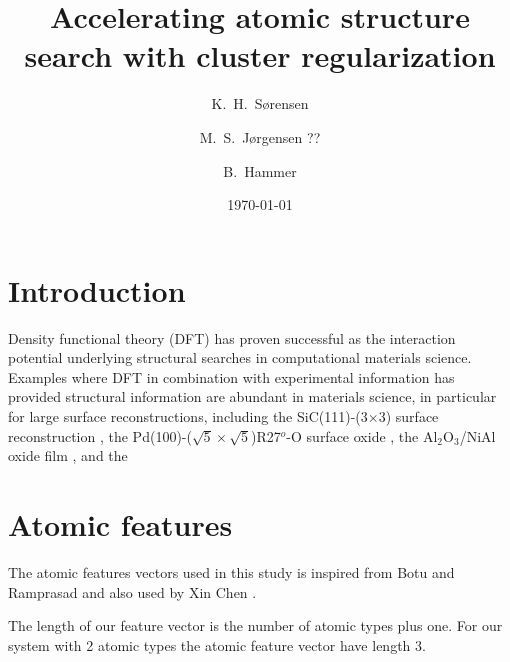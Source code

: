 \documentclass[%
 aps,
 prl,%
 amsmath,amssymb,
 reprint,%
]{revtex4-1}
\begin{document}
\title[]{Accelerating atomic structure search with cluster regularization}%

\author{K.\ H.\ S{\o}rensen}
\author{M.\ S.\ J{\o}rgensen ??}
\author{B.\ Hammer}
 
\date{\today}%

\begin{abstract}
\end{abstract}

\keywords{}%
\maketitle

\section{\label{sec:introduction}Introduction}
Density functional theory (DFT) has proven successful as the
interaction potential underlying structural searches in computational
materials science. Examples where DFT in combination with experimental information
has provided structural information are abundant in materials science, in particular
for large surface reconstructions, including the SiC(111)-(3$\times$3) surface reconstruction \cite{Starke1998}, the Pd(100)-($\sqrt{5}\times \sqrt{5}$)R27$^o$-O surface oxide \cite{Todorova2003}, the Al$_2$O$_3$/NiAl oxide film \cite{Kresse2005}, and the


\section{Atomic features}
 
The atomic features vectors used in this study is inspired from Botu and Ramprasad \cite{Boto2015} and also used by Xin Chen \cite{Chen2017}.

The length of our feature vector is the number of atomic types plus one. For our system with 2 atomic types the atomic feature vector have length 3.
\end{document}
